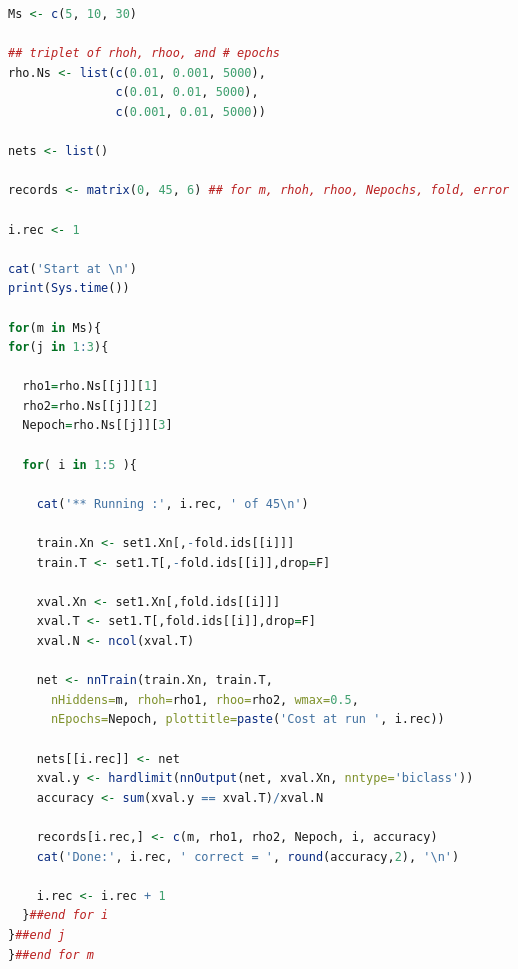 \begin{lstlisting}[language=R,caption={ตัวอย่างโค้ดการทำครอสวาลิเดชั่นห้าพับ},label={lst: ann mammo cross validation}]
Ms <- c(5, 10, 30)

## triplet of rhoh, rhoo, and # epochs
rho.Ns <- list(c(0.01, 0.001, 5000),
               c(0.01, 0.01, 5000),
               c(0.001, 0.01, 5000))

nets <- list()

records <- matrix(0, 45, 6) ## for m, rhoh, rhoo, Nepochs, fold, error

i.rec <- 1

cat('Start at \n')
print(Sys.time())

for(m in Ms){
for(j in 1:3){

  rho1=rho.Ns[[j]][1]
  rho2=rho.Ns[[j]][2]
  Nepoch=rho.Ns[[j]][3]

  for( i in 1:5 ){  

    cat('** Running :', i.rec, ' of 45\n')

    train.Xn <- set1.Xn[,-fold.ids[[i]]]
    train.T <- set1.T[,-fold.ids[[i]],drop=F]

    xval.Xn <- set1.Xn[,fold.ids[[i]]]
    xval.T <- set1.T[,fold.ids[[i]],drop=F]
    xval.N <- ncol(xval.T)

    net <- nnTrain(train.Xn, train.T, 
      nHiddens=m, rhoh=rho1, rhoo=rho2, wmax=0.5, 
      nEpochs=Nepoch, plottitle=paste('Cost at run ', i.rec))
   
    nets[[i.rec]] <- net
    xval.y <- hardlimit(nnOutput(net, xval.Xn, nntype='biclass'))
    accuracy <- sum(xval.y == xval.T)/xval.N

    records[i.rec,] <- c(m, rho1, rho2, Nepoch, i, accuracy)     
    cat('Done:', i.rec, ' correct = ', round(accuracy,2), '\n')

    i.rec <- i.rec + 1
  }##end for i
}##end j
}##end for m
\end{lstlisting}

